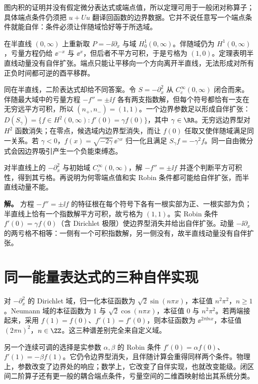 图内积的证明并没有假定微分表达式或端点值，所以定理可用于一般闭对称算子；具体端点条件仍须把 \(u+Uu\) 翻译回函数的边界数据。它并不说任意写一个端点条件就能自伴：条件必须让伴随域恰好等于所选域。

在半直线 \((0,\infty)\) 上重新取 \(P=-\ii\partial_x\) 与域 \(H_0^1(0,\infty)\)。伴随域仍为 \(H^1(0,\infty)\)，亏量方程仍给 \(\ee^{-x}\) 与 \(\ee^x\)，但后者不平方可积，于是亏格为 \((1,0)\)。定理表明半直线动量没有自伴扩张。端点只能让平移向一个方向离开半直线，无法形成对所有正负时间都可逆的酉平移群。

同在半直线，二阶表达式却给不同答案。令 \(S=-\partial_x^2\) 从 \(C_c^\infty(0,\infty)\) 闭合而来。伴随最大域中的亏量方程 \(-f''=\pm\ii f\) 各有两支指数解，但每个符号都恰有一支在无穷远平方可积，所以 \((n_+,n_-)=(1,1)\)。一个边界参数足以形成自伴扩张：\(D(S_\gamma)=\{f\in H^2(0,\infty):f'(0)=\gamma f(0)\}\)，其中 \(\gamma\in\RR\)。无穷远边界型对 \(H^2\) 函数消失；在零点，候选域内边界型消失，而让 \(f(0)\) 任取又使伴随域满足同一关系。若 \(\gamma<0\)，\(f(x)=\sqrt{-2\gamma}\,\ee^{\gamma x}\) 归一化且满足 \(S_\gamma f=-\gamma^2f\)。同一自由微分式会因边界吸引产生一个负能束缚态。


\par
\begin{workedexample}
对半直线上的 \(-\partial_x^2\) 与初始域 \(C_c^\infty(0,\infty)\)，解 \(-f''=\pm\ii f\) 并逐个判断平方可积性，得到其亏格。再说明为何零端点值和实 Robin 条件都可能给自伴扩张，而半直线动量不能。


\textbf{解。} 方程 \(-f''=\pm\ii f\) 的特征根在每个符号下各有一根实部为正、一根实部为负；半直线上恰有一个指数解平方可积，故亏格为 \((1,1)\)。实 Robin 条件 \(f'(0)=\gamma f(0)\)（含 Dirichlet 极限）使边界型消失并给出自伴扩张。动量 \(-\ii\partial_x\) 的两亏格不相等：一侧有一个可积指数解，另一侧没有，故半直线动量没有自伴扩张。
\end{workedexample}
\par
\section{同一能量表达式的三种自伴实现}

对 \(-\partial_x^2\) 的 Dirichlet 域，归一化本征函数为 \(\sqrt2\sin(n\pi x)\)，本征值 \(n^2\pi^2\)，\(n\ge1\)。Neumann 域的本征函数为 \(1\) 与 \(\sqrt2\cos(n\pi x)\)，本征值 \(0\) 与 \(n^2\pi^2\)。若两端接起来，采用 \(f(1)=f(0)\)、\(f'(1)=f'(0)\)，则本征函数为 \(\ee^{2\pi\ii nx}\)，本征值 \((2\pi n)^2\)，\(n\in\ZZ\)。这三种谱差别完全来自定义域。

另一个连续可调的选择是实参数 \(\alpha,\beta\) 的 Robin 条件 \(f'(0)=\alpha f(0)\)、\(f'(1)=-\beta f(1)\)。它仍令边界型消失，且伴随计算会重得同样两个条件。物理上，参数改变了边界处的响应；数学上，它改变了自伴实现，也就改变能级。闭区间二阶算子还有更一般的耦合端点条件，亏量空间的二维酉映射给出其系统分类。

